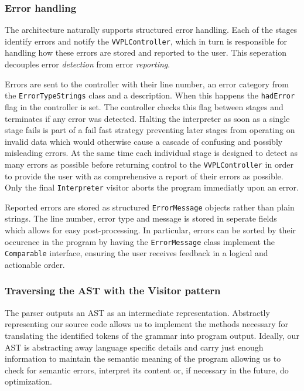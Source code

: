 \subsubsection{Error handling}
The architecture naturally supports structured error handling.
Each of the stages identify errors and notify the \texttt{VVPLController}, which in turn is responsible for 
handling how these errors are stored and reported to the user.
This seperation decouples error \emph{detection} from error \emph{reporting}.

Errors are sent to the controller with their line number, an error category from the \texttt{ErrorTypeStrings} class
and a description. When this happens the \texttt{hadError} flag in the controller is set.
The controller checks this flag between stages and terminates if any error was detected.
Halting the interpreter as soon as a single stage fails is part of a fail fast strategy preventing later stages from operating 
on invalid data which would otherwise cause a cascade of confusing and possibly misleading errors.
At the same time each individual stage is designed to detect as many errors as possible before returning
control to the \texttt{VVPLController} in order to provide the user with as comprehensive a report of their errors as possible. Only the final \verb|Interpreter| visitor aborts the program immediatly upon an error.

Reported errors are stored as structured \texttt{ErrorMessage} objects rather than plain strings.
The line number, error type and message is stored in seperate fields which allows for easy post-processing.
In particular, errors can be sorted by their occurence in the program by having the \texttt{ErrorMessage} class
implement the \texttt{Comparable} interface, ensuring the user receives feedback in a logical and actionable order.

\subsubsection{Traversing the AST with the Visitor pattern}

The parser outputs an AST as an intermediate representation. 
Abstractly representing our source code allows us to implement the methods necessary for translating the identified tokens of the grammar into program output.
Ideally, our AST is abstracting away language specific details and carry just enough information to maintain the semantic meaning of the program allowing us 
to check for semantic errors, interpret its content or, if necessary in the future, do optimization.
 
